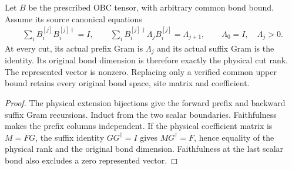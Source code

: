 \begin{lemma}
    \label{lem:quadratic_canonical_obc_physical_ranks}
    \leanok
    Let $B$ be the prescribed OBC tensor, with arbitrary common bond
    bound. Assume its source canonical equations
    \begin{align}
        \sum_i B_i^{[j]}B_i^{[j]\dagger}=I,\qquad
        \sum_i B_i^{[j]\dagger}\Lambda_j B_i^{[j]}=\Lambda_{j+1},
        \qquad\Lambda_0=I,\quad\Lambda_j>0.
    \end{align}
    At every cut, its actual prefix Gram is $\Lambda_j$ and its
    actual suffix Gram is the identity. Its original bond dimension
    is therefore exactly the physical cut rank. The represented
    vector is nonzero. Replacing only a verified common upper bound
    retains every original bond space, site matrix and coefficient.
\end{lemma}
\begin{proof}
    \leanok
    The physical extension bijections give the forward prefix and
    backward suffix Gram recursions. Induct from the two scalar
    boundaries. Faithfulness makes the prefix columns independent.
    If the physical coefficient matrix is $M=FG$, the suffix identity
    $GG^\dagger=I$ gives $MG^\dagger=F$, hence equality of the physical
    rank and the original bond dimension. Faithfulness at the last
    scalar bond also excludes a zero represented vector.
\end{proof}

